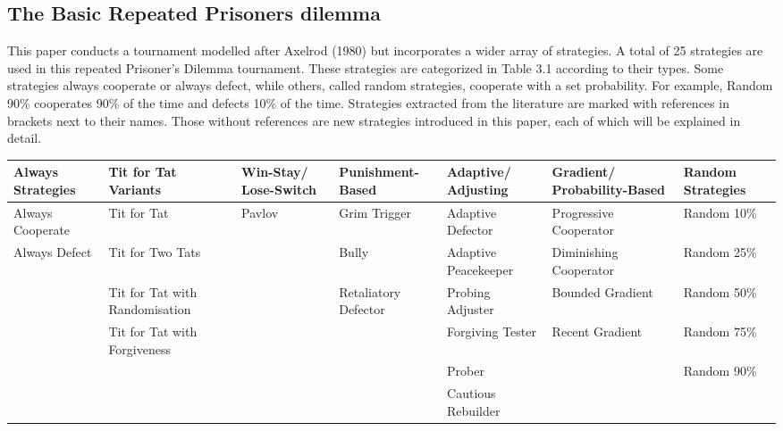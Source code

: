 \documentclass[11pt,preprint]{elsarticle}
\let\origtable\table
\let\endorigtable\endtable
\renewenvironment{table}[1][2] {
    \expandafter\origtable\expandafter[H]
} {
    \endorigtable
}
\numberwithin{equation}{section}
\numberwithin{figure}{section}
\numberwithin{table}{section}
\begin{document}
\hypertarget{the-basic-repeated-prisoners-dilemma}{%
\subsection{The Basic Repeated Prisoners
dilemma}\label{the-basic-repeated-prisoners-dilemma}}

This paper conducts a tournament modelled after Axelrod (1980) but
incorporates a wider array of strategies. A total of 25 strategies are
used in this repeated Prisoner's Dilemma tournament. These strategies
are categorized in Table 3.1 according to their types. Some strategies
always cooperate or always defect, while others, called random
strategies, cooperate with a set probability. For example, Random 90\%
cooperates 90\% of the time and defects 10\% of the time. Strategies
extracted from the literature are marked with references in brackets
next to their names. Those without references are new strategies
introduced in this paper, each of which will be explained in detail.

\renewcommand{\arraystretch}{1.2} %
\begin{table}[ht]
\centering
\tiny %
\begin{tabular}{|>{\centering\arraybackslash}p{2cm}|>{\centering\arraybackslash}p{2cm}|>{\centering\arraybackslash}p{2cm}|>{\centering\arraybackslash}p{2cm}|>{\centering\arraybackslash}p{2cm}|>{\centering\arraybackslash}p{2cm}|>{\centering\arraybackslash}p{2cm}|}
\hline
\textbf{Always Strategies} & \textbf{Tit for Tat Variants} & \textbf{Win-Stay/ Lose-Switch} & \textbf{Punishment-Based} & \textbf{Adaptive/ Adjusting} & \textbf{Gradient/ Probability-Based} & \textbf{Random Strategies} \\
\hline
Always Cooperate & Tit for Tat & Pavlov & Grim Trigger & Adaptive Defector & Progressive Cooperator & Random 10\% \\
Always Defect & Tit for Two Tats & & Bully & Adaptive Peacekeeper & Diminishing Cooperator & Random 25\% \\
& Tit for Tat with Randomisation & & Retaliatory Defector & Probing Adjuster & Bounded Gradient & Random 50\% \\
& Tit for Tat with Forgiveness & & & Forgiving Tester & Recent Gradient & Random 75\% \\
& & & & Prober & & Random 90\% \\
& & & & Cautious Rebuilder & & \\
\hline
\end{tabular}
\caption{Categorisation of Strategy Types Used in the Prisoner's Dilemma Tournament}
\end{table}
\end{document}

